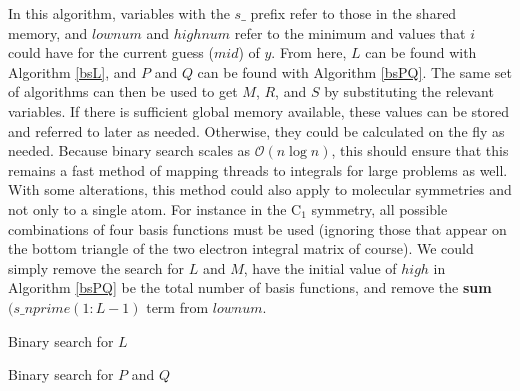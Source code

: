 In this algorithm, variables with the $s\_$ prefix refer to those in the shared memory, and $lownum$ and $highnum$ refer to the minimum and values that $i$ could have for the current guess ($mid$) of $y$. From here, $L$ can be found with Algorithm \ref{bsL}, and $P$ and $Q$ can be found with Algorithm \ref{bsPQ}. The same set of algorithms can then be used to get $M$, $R$, and $S$ by substituting the relevant variables. If there is sufficient global memory available, these values can be stored and referred to later as needed. Otherwise, they could be calculated on the fly as needed. Because binary search scales as $\mathcal{O}(n\log{}n)$, this should ensure that this remains a fast method of mapping threads to integrals for large problems as well. With some alterations, this method could also apply to molecular symmetries and not only to a single atom. For instance in the C$_{1}$ symmetry, all possible combinations of four basis functions must be used (ignoring those that appear on the bottom triangle of the two electron integral matrix of course). We could simply remove the search for $L$ and $M$, have the initial value of $high$ in Algorithm \ref{bsPQ} be the total number of basis functions, and remove the \textbf{sum}$(s\_nprime(1:L-1)$ term from $lownum$.

\begin{algorithm}
\caption{Binary search for $L$}
\label{bsL}
\begin{algorithmic}

		\ENDIF
	\ENDWHILE
\ENDIF

\end{algorithmic}
\end{algorithm}

\begin{algorithm}
\caption{Binary search for $P$ and $Q$}
\label{bsPQ}
\begin{algorithmic}

		\ENDIF
	\ENDWHILE
\ENDIF

\end{algorithmic}
\end{algorithm}


